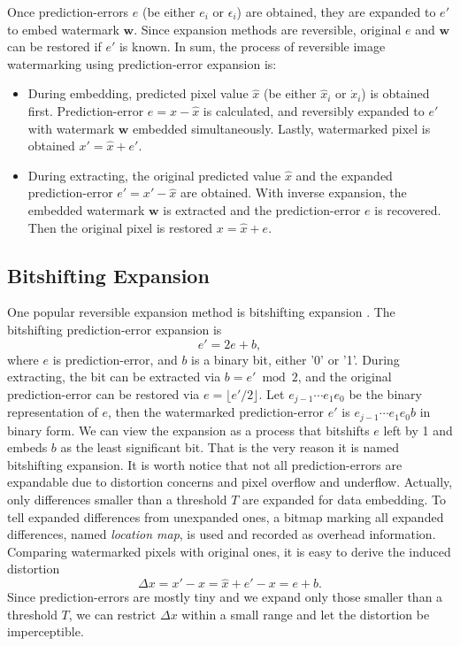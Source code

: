 \documentclass[journal]{IEEEtran}
\begin{document}
Once prediction-errors $e$ (be either $e_i$ or $\epsilon_i$) are obtained, they are expanded to
$e'$ to embed watermark $\mathbf{w}$. Since expansion methods are reversible, original $e$ and
$\mathbf{w}$ can be restored if $e'$ is known. In sum, the process of reversible image watermarking
using prediction-error expansion is: 
\begin{itemize}
    \item During embedding, predicted pixel value $\hat{x}$ (be either $\hat{x}_i$ or $\dot{x}_i$)
	is obtained first. Prediction-error $e = x - \hat{x}$ is calculated, and reversibly expanded
	to $e'$ with watermark $\mathbf{w}$ embedded simultaneously. Lastly, watermarked pixel is
	obtained $x' = \hat{x} + e'$.
    \item During extracting, the original predicted value $\hat{x}$ and the expanded
	prediction-error $e' = x' - \hat{x}$ are obtained. With inverse expansion, the embedded
	watermark $\mathbf{w}$ is extracted and the prediction-error $e$ is recovered. Then the
	original pixel is restored $x = \hat{x} + e$. 
\end{itemize}

\subsection{Bitshifting Expansion}\label{sub:bde}
One popular reversible expansion method is bitshifting expansion \cite{Tian03de}. The bitshifting
prediction-error expansion is 
\begin{equation}\label{eqn:bpe}
	e' = 2e + b,
\end{equation}
where $e$ is prediction-error, and $b$ is a binary bit, either '0' or '1'. During extracting, the
bit can be extracted via $b = e' \bmod 2$, and the original prediction-error can be restored
via $e = \lfloor e'/2 \rfloor$.  Let $e_{j-1} \cdots e_{1}e_{0}$ be the binary representation of
$e$, then the watermarked prediction-error $e'$ is $e_{j-1} \cdots e_{1}e_{0}b$ in binary form. We
can view the expansion as a process that bitshifts $e$ left by 1 and embeds $b$ as the least
significant bit. That is the very reason it is named bitshifting expansion. It is worth notice that
not all prediction-errors are expandable due to distortion concerns and pixel overflow and
underflow. Actually, only differences smaller than a threshold $T$ are expanded for data embedding.
To tell expanded differences from unexpanded ones, a bitmap marking all expanded differences, named
\emph{location map}, is used and recorded as overhead information. Comparing watermarked pixels with
original ones, it is easy to derive the induced distortion 
\begin{equation}\label{eqn:bitdis}
    \Delta x = x' - x = \hat{x} + e' - x = e + b.
\end{equation}
Since prediction-errors are mostly tiny and we expand only those smaller than a threshold $T$, we
can restrict $\Delta x$ within a small range and let the distortion be imperceptible. 
\end{document}
